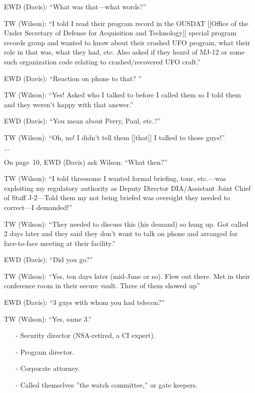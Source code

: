 \begin{svgraybox}
\noindent EWD (Davis): ``What was that---what words?''

\noindent TW (Wilson): ``I told I read their program record in the OUSDAT [[Office of the Under Secretary of Defense for Acquisition and Technology]]
special program records group  and wanted to know about their crashed UFO program, what their role in that was, what
they had, etc. Also asked if they heard of MJ-12 or some such organization code relating to crashed/recovered UFO craft.''

\noindent EWD (Davis): ``Reaction on phone to that? ''

\noindent TW (Wilson): ``Yes! Asked who I talked to before I called them so I told them and they weren't happy with that answer.''

\noindent EWD (Davis): ``You mean about Perry, Paul, etc.?''

\noindent TW (Wilson): ``Oh, no! I didn't tell them [[that]] I talked to those guys!''

$\ldots$

On page~10, EWD (Davis) ask Wilson: ``What then?''

\noindent TW (Wilson): ``I told threesome I wanted formal briefing, tour, etc.---was exploiting my regulatory
authority as Deputy Director DIA/Assistant Joint Chief of Staff J-2---Told them my not
being briefed was oversight they needed to correct---I demanded!''

\noindent TW (Wilson): ``They needed to discuss this (his demand) so hung up. Got called 2 days later and
they said they don't want to talk on phone and arranged for face-to-face meeting at their facility.''

\noindent EWD (Davis): ``Did you go?''

\noindent TW (Wilson): ``Yes, ten days later (mid-June or so). Flew out there. Met in their conference room in their secure vault. Three of them showed up''

\noindent EWD (Davis): ``3 guys with whom you had telecon?''

\noindent TW (Wilson): ``Yes, same 3.''
\begin{enumerate}
\item[-]
Security director (NSA-retired, a CI expert).
\item[-]
Program director.
\item[-]
Corporate attorney.
\item[-]
Called themselves ''the watch committee,'' or gate keepers.
\end{enumerate}


\end{svgraybox}
